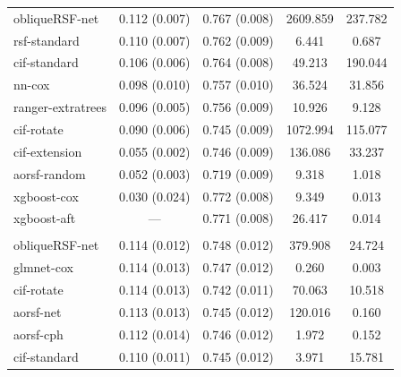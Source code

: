 \documentclass[twoside,11pt]{article}\usepackage[]{graphicx}\usepackage[]{xcolor}
\newenvironment{knitrout}{}{} %
\begin{document}
\begin{knitrout}
\begin{longtable}[t]{lcccc}
\hspace{1em}obliqueRSF-net & 0.112 (0.007) & 0.767 (0.008) & 2609.859 & 237.782\\
\hspace{1em}rsf-standard & 0.110 (0.007) & 0.762 (0.009) & 6.441 & 0.687\\
\hspace{1em}cif-standard & 0.106 (0.006) & 0.764 (0.008) & 49.213 & 190.044\\
\hspace{1em}nn-cox & 0.098 (0.010) & 0.757 (0.010) & 36.524 & 31.856\\
\hspace{1em}ranger-extratrees & 0.096 (0.005) & 0.756 (0.009) & 10.926 & 9.128\\
\hspace{1em}cif-rotate & 0.090 (0.006) & 0.745 (0.009) & 1072.994 & 115.077\\
\hspace{1em}cif-extension & 0.055 (0.002) & 0.746 (0.009) & 136.086 & 33.237\\
\hspace{1em}aorsf-random & 0.052 (0.003) & 0.719 (0.009) & 9.318 & 1.018\\
\hspace{1em}xgboost-cox & 0.030 (0.024) & 0.772 (0.008) & 9.349 & 0.013\\
\hspace{1em}xgboost-aft & --- & 0.771 (0.008) & 26.417 & 0.014\\
\addlinespace[0.3em]
\multicolumn{5}{l}{\textit{\textbf{Systolic Heart Failure; death, n = 2231, p = 41}}}\\
\hline
\hspace{1em}obliqueRSF-net & 0.114 (0.012) & 0.748 (0.012) & 379.908 & 24.724\\
\hspace{1em}glmnet-cox & 0.114 (0.013) & 0.747 (0.012) & 0.260 & 0.003\\
\hspace{1em}cif-rotate & 0.114 (0.013) & 0.742 (0.011) & 70.063 & 10.518\\
\hspace{1em}aorsf-net & 0.113 (0.013) & 0.745 (0.012) & 120.016 & 0.160\\
\hspace{1em}aorsf-cph & 0.112 (0.014) & 0.746 (0.012) & 1.972 & 0.152\\
\hspace{1em}cif-standard & 0.110 (0.011) & 0.745 (0.012) & 3.971 & 15.781\\

\end{longtable}
\end{knitrout}
\end{document}
